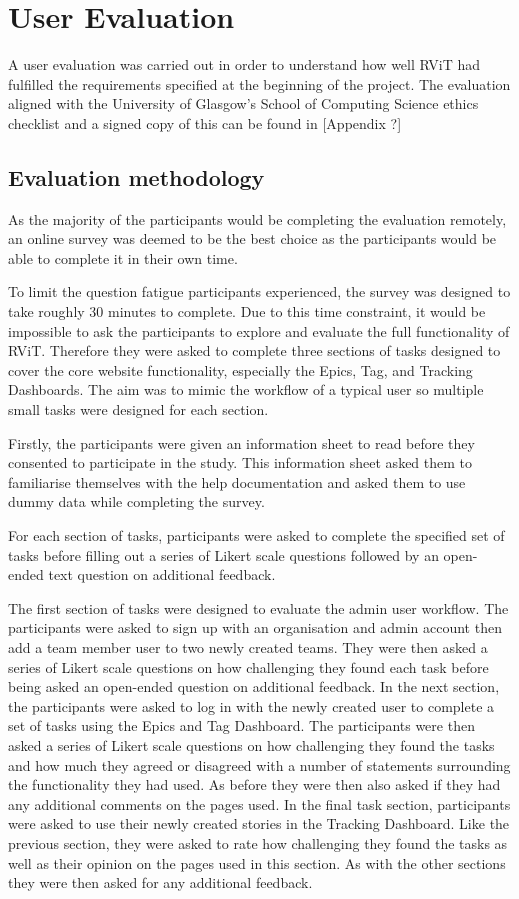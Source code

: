 \documentclass[l4proj.tex]{subfiles}
\begin{document}
\section{User Evaluation}
A user evaluation was carried out in order to understand how well RViT had fulfilled the requirements specified at the beginning of the project. The evaluation aligned with the University of Glasgow's School of Computing Science ethics checklist and a signed copy of this can be found in [Appendix ?]


\subsection{Evaluation methodology}
As the majority of the participants would be completing the evaluation remotely, an online survey was deemed to be the best choice as the participants would be able to complete it in their own time.

To limit the question fatigue participants experienced, the survey was designed to take roughly 30 minutes to complete. Due to this time constraint, it would be impossible to ask the participants to explore and evaluate the full functionality of RViT. Therefore they were asked to complete three sections of tasks designed to cover the core website functionality, especially the Epics, Tag, and Tracking Dashboards. The aim was to mimic the workflow of a typical user so multiple small tasks were designed for each section.

Firstly, the participants were given an information sheet to read before they consented to participate in the study. This information sheet asked them to familiarise themselves with the help documentation and asked them to use dummy data while completing the survey.

For each section of tasks, participants were asked to complete the specified set of tasks before filling out a series of Likert scale questions followed by an open-ended text question on additional feedback.

The first section of tasks were designed to evaluate the admin user workflow. The participants were asked to sign up with an organisation and admin account then add a team member user to two newly created teams. They were then asked a series of Likert scale questions on how challenging they found each task before being asked an open-ended question on additional feedback. In the next section, the participants were asked to log in with the newly created user to complete a set of tasks using the Epics and Tag Dashboard. The participants were then asked a series of Likert scale questions on how challenging they found the tasks and how much they agreed or disagreed with a number of statements surrounding the functionality they had used. As before they were then also asked if they had any additional comments on the pages used. In the final task section, participants were asked to use their newly created stories in the Tracking Dashboard. Like the previous section, they were asked to rate how challenging they found the tasks as well as their opinion on the pages used in this section. As with the other sections they were then asked for any additional feedback.
\end{document}
